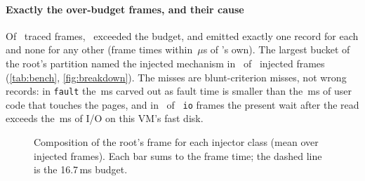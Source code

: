 \begin{table}[t]
\centering
\footnotesize
\resizebox{\textwidth}{!}{}
\caption{Attribution on \bench (medians over injected frames). \emph{Top
group}: the record's first-ranked stall group has the expected cause; on-CPU
classes have no group (--). \emph{Longest stall / excess}: the root's single
longest stall interval as a fraction of the frame's overrun, the most a
per-stall threshold could see. \emph{Share}: the root's stall time over the
overrun, as the prototype's in-kernel gate computes it. \emph{Resolved
gate}: the same with time spent waiting on a running task subtracted,
computed offline from the records. Generated by
\texttt{plot/src/hitchbench\_results.py}.}
\label{tab:bench}
\end{table}

\paragraph{Exactly the over-budget frames, and their cause} Of
\hbtotFrames\ traced frames, \hbtotOver\ exceeded the budget, and \sys
emitted exactly one record for each and none for any other (frame times
within \hbmaxDtUs\,$\mu$s of \bench's own). The largest bucket of the
root's partition named the injected mechanism in \hbtotMatch\ of
\hbtotInj\ injected frames (\autoref{tab:bench}, \autoref{fig:breakdown}).
The misses are blunt-criterion misses, not wrong records: in \texttt{fault}
the \hbfaultoncpufault\,ms carved out as fault time is smaller than the
\hbfaultoncpu\,ms of user code that touches the pages, and in
\hbioToppresent\ of \hbioCaught\ \texttt{io} frames the present wait after
the read exceeds the \hbioblockio\,ms of I/O on this VM's fast disk.

\begin{figure}[t]
\centering

\caption{Composition of the root's frame for each injector class (mean over
injected frames). Each bar sums to the frame time; the dashed line is the
16.7\,ms budget.}
\label{fig:breakdown}
\end{figure}

